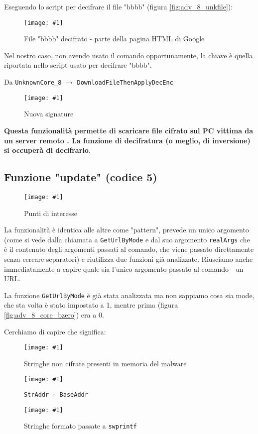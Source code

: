 \documentclass[
    a4paper, %
    11pt %
]{article}
\newcommand{\pic}[4]{\begin{figure}[H]
            \centering
            \texttt{[image: \#1]}
            \caption{#2}
            \label{fig:#1}
            \end{figure}}
\begin{document}
            Eseguendo lo script per decifrare il file "bbbb" (figura \ref{fig:adv_8_unkfile}):
            
            \pic{adv_8_core_decrypt_script_output}{File "bbbb" decifrato - parte della pagina HTML di Google}{19cm}{7cm}

            Nel nostro caso, non avendo usato il comando opportunamente, la chiave è quella riportata nello
            script usato per decifrare "bbbb".

            Da \texttt{UnknownCore\_8} $\rightarrow$ \texttt{DownloadFileThenApplyDecEnc}

            \pic{adv_8_core_newsign}{Nuova signature}{14cm}{1.5cm}

            \textbf{Questa funzionalità permette di scaricare file cifrato sul PC vittima da un server remoto 
            . La funzione di decifratura (o meglio, di inversione) si occuperà di decifrarlo}.

            \subsection{Funzione "update" (codice 5)}
            
            \pic{adv_5}{Punti di interesse}{15cm}{10cm}

            La funzionalità è identica alle altre come "pattern", prevede un unico argomento (come si 
            vede dalla chiamata a \texttt{GetUrlByMode} e dal suo argomento \texttt{realArgs} che è il
            contenuto degli argomenti passati al comando, che viene passato direttamente senza cercare
            separatori) e riutilizza due funzioni già analizzate. Riusciamo anche immediatamente a capire
            quale sia l'unico argomento passato al comando - un URL.

            La funzione \texttt{GetUrlByMode} è già stata analizzata ma non sappiamo cosa sia mode, che sta
            volta è stato impostato a 1, mentre prima (figura \ref{fig:adv_8_core_bzero}) era a 0.

            Cerchiamo di capire che significa:

            \pic{adv_5_url_modes}{Stringhe non cifrate presenti in memoria del malware}{15cm}{3.5cm}

            \pic{adv_5_url_calc}{\texttt{StrAddr - BaseAddr}}{10cm}{2cm}

            \pic{adv_5_url_fmts}{Stringhe formato passate a \texttt{swprintf}}{10cm}{3cm}
\end{document}
